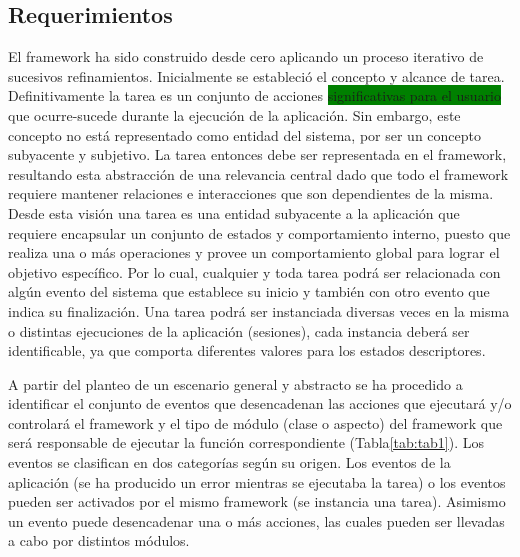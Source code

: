 \subsection{Requerimientos}
\label{subsec:requerimientos}
El framework ha sido construido desde cero aplicando un proceso iterativo de sucesivos refinamientos. Inicialmente se estableció el concepto y alcance de tarea. Definitivamente la tarea es un conjunto de acciones \colorbox{green}{significativas para el usuario} que ocurre-sucede durante la ejecución de la aplicación. Sin embargo, este concepto no está representado como entidad del sistema, por ser un concepto subyacente y subjetivo. La tarea entonces debe ser representada en el framework, resultando esta abstracción de una relevancia central dado que todo el framework requiere mantener relaciones e interacciones que son dependientes de la misma. Desde esta visión una  tarea es una entidad subyacente a la aplicación que requiere encapsular un conjunto de estados y comportamiento interno,  puesto que realiza una o más operaciones y provee un comportamiento global para lograr el objetivo específico. Por lo cual, cualquier y toda tarea podrá ser relacionada con algún evento del sistema que establece su inicio y también con otro evento que indica su finalización. Una tarea podrá ser instanciada diversas veces en la misma o distintas ejecuciones de la aplicación (sesiones), cada instancia deberá ser identificable, ya que comporta diferentes valores para los estados descriptores. 

A partir del planteo de un escenario general y abstracto se ha procedido a identificar el conjunto de eventos que desencadenan las acciones que ejecutará y/o controlará el framework y el tipo de módulo (clase o aspecto) del framework que será responsable de ejecutar la función correspondiente (Tabla\ref{tab:tab1}).  Los  eventos se clasifican en dos categorías según su origen. Los eventos de la aplicación (se ha producido un error mientras se ejecutaba la tarea) o los eventos pueden ser activados  por el mismo framework (se instancia una tarea). Asimismo un evento puede desencadenar una o más acciones, las cuales pueden ser llevadas a cabo por distintos módulos. 

